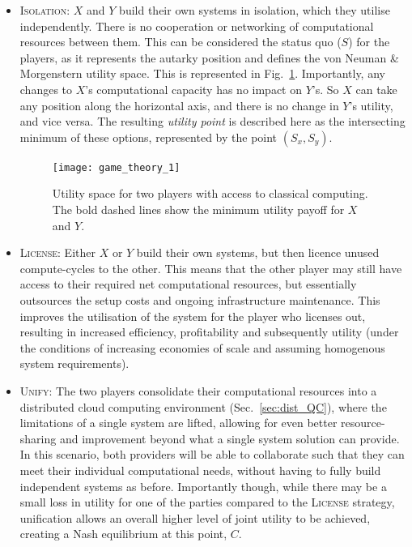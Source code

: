 \begin{itemize}
	\item \textsc{Isolation}: $X$ and $Y$ build their own systems in isolation, which they utilise independently. There is no cooperation or networking of computational resources between them. This can be considered the status quo ($S$) for the players, as it represents the autarky position and defines the von Neuman \& Morgenstern utility space.  This is represented in Fig.~\ref{fig:game_theory_1}. Importantly, any changes to $X$'s computational capacity has no impact on $Y$'s. So $X$ can take any position along the horizontal axis, and there is no change in $Y$'s utility, and vice versa. The resulting \textit{utility point} is described here as the intersecting minimum of these options, represented by the point \mbox{$(S_x, S_y)$}.

\begin{figure}[!htbp]
\texttt{[image: game\_theory\_1]}
\captionspacefig \caption{Utility space for two players with access to classical computing. The bold dashed lines show the minimum utility payoff for $X$ and $Y$.}\label{fig:game_theory_1}
\end{figure}

\item \textsc{License}: Either $X$ or $Y$ build their own systems, but then licence unused compute-cycles to the other. This means that the other player may still have access to their required net computational resources, but essentially outsources the setup costs and ongoing infrastructure maintenance. This improves the utilisation of the system for the player who licenses out, resulting in increased efficiency, profitability and subsequently utility (under the conditions of increasing economies of scale and assuming homogenous system requirements).

\item \textsc{Unify}: The two players consolidate their computational resources into a distributed cloud computing environment (Sec.~\ref{sec:dist_QC}), where the limitations of a single system are lifted, allowing for even better resource-sharing and improvement beyond what a single system solution can provide. In this scenario, both providers will be able to collaborate such that they can meet their individual computational needs, without having to fully build independent systems as before. Importantly though, while there may be a small loss in utility for one of the parties compared to the \textsc{License} strategy, unification allows an overall higher level of joint utility to be achieved, creating a Nash equilibrium at this point, $C$.
\end{itemize}

